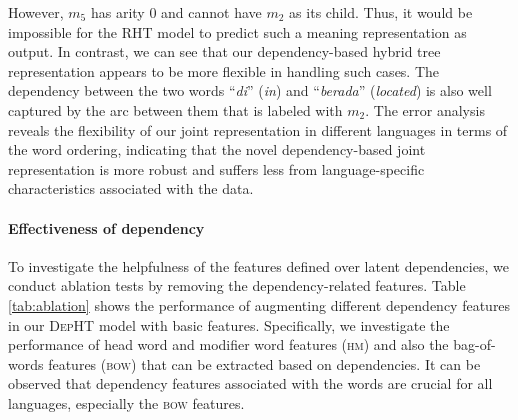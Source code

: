 However, $m_5$ has arity 0 and cannot have $m_2$ as its child. 
Thus, it would be impossible for the RHT model to predict such a meaning representation as output.
In contrast, we can see that our dependency-based hybrid tree representation appears to be more flexible in handling such cases. 
The dependency  between the two words ``{\em di}'' ({\em in}) and ``{\em berada}'' ({\em located}) is also well captured by the arc between them that is labeled with $m_2$.
The error analysis reveals the flexibility of our joint representation in different languages in terms of the word ordering, indicating that the novel dependency-based joint representation is more robust and suffers less from language-specific characteristics associated with the data.


\paragraph{Effectiveness of dependency}
To investigate the helpfulness of the features defined over latent dependencies, we conduct  ablation tests by removing the dependency-related features. 
Table \ref{tab:ablation} shows the performance of augmenting different dependency features in our \textsc{DepHT} model with basic features. 
Specifically, we investigate the performance of head word and modifier word features (\textsc{hm}) and also the bag-of-words features (\textsc{bow}) that can be extracted based on dependencies. 
It can be observed that dependency features  associated with the words are crucial for all languages, especially the \textsc{bow} features. 
\begin{table}[t!]
	\centering
	\renewcommand{\arraystretch}{1} %
	\vspace*{-2mm}
	\caption{$F_1$ scores of our model with different dependency features.}
	\label{tab:ablation}
	\vspace*{-3mm}
\end{table}


